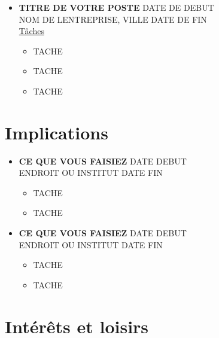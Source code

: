 \documentclass[twoside,letterpaper,11  pt]{article}
\begin{document}
\begin{flushleft}
\begin{itemize}[label={}]
\item \textbf{TITRE DE VOTRE POSTE} \hfill  DATE DE DEBUT\\
NOM DE LENTREPRISE, VILLE \hfill DATE DE FIN\\

\smallbreak
\underline{Tâches}\\ %
\begin{itemize}[label=\textbullet, font=  \scriptsize]
    \item TACHE
    \item TACHE
    \item TACHE
\end{itemize}

\end{itemize}


\bigbreak

\section*{Implications} %

\bigbreak
\begin{itemize}[label={}]
\item \textbf{CE QUE VOUS FAISIEZ} \hfill DATE DEBUT\\
ENDROIT OU INSTITUT \hfill DATE FIN\\
\begin{itemize}[label=\textbullet, font=  \scriptsize]
    \item TACHE
    \item TACHE
\end{itemize}

\bigbreak 

\item \textbf{CE QUE VOUS FAISIEZ} \hfill DATE DEBUT\\
ENDROIT OU INSTITUT \hfill DATE FIN\\
\begin{itemize}[label=\textbullet, font=  \scriptsize]
    \item TACHE
    \item TACHE
\end{itemize}

\end{itemize}


\section*{Intérêts et loisirs}%


\end{flushleft}
\end{document}
